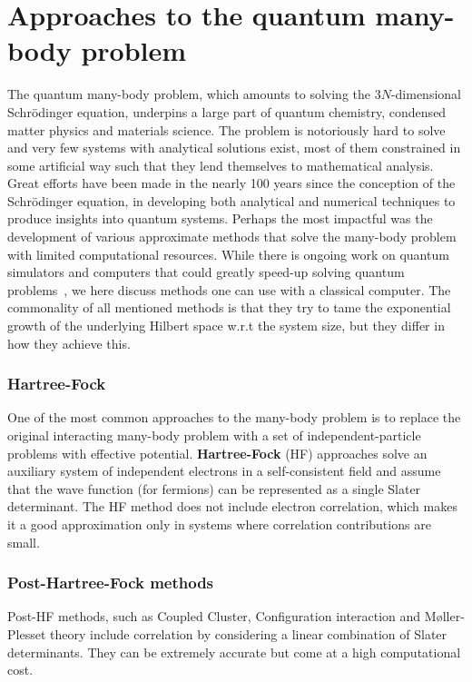\section{Approaches to the quantum many-body problem}
\label{sec:QMBP}
The quantum many-body problem, which amounts to solving the $3N$-dimensional Schr\"odinger equation, underpins a large part of quantum chemistry, condensed matter physics and materials science. The problem is notoriously hard to solve and very few systems with analytical solutions exist, most of them constrained in some artificial way such that they lend themselves to mathematical analysis. Great efforts have been made in the nearly 100 years since the conception of the Schr\" odinger equation, in developing both analytical and numerical techniques to produce insights into quantum systems. Perhaps the most impactful was the development of various approximate methods that solve the many-body problem with limited computational resources. While there is ongoing work on quantum simulators and computers that could greatly speed-up solving quantum problems~\cite{feynman2018simulating, childs2010relationship}, we here discuss methods one can use with a classical computer. The commonality of all mentioned methods is that they try to tame the exponential growth of the underlying Hilbert space w.r.t the system size, but they differ in how they achieve this. 

\subsubsection{Hartree-Fock}
One of the most common approaches to the many-body problem is to replace the original interacting many-body problem with a set of independent-particle problems with effective potential. \textbf{Hartree-Fock} (HF) approaches solve an auxiliary system of independent electrons in a self-consistent field and assume that the wave function (for fermions) can be represented as a single Slater determinant. The HF method does not include electron correlation, which makes it a good approximation only in systems where correlation contributions are small. 

\subsubsection{Post-Hartree-Fock methods}
Post-HF methods, such as Coupled Cluster, Configuration interaction and M\o ller-Plesset theory include correlation by considering a linear combination of Slater determinants. They can be extremely accurate but come at a high computational cost. 

